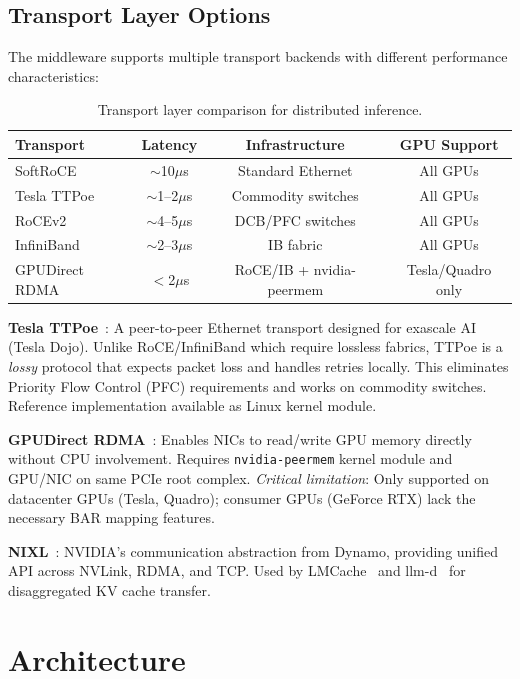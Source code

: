 \documentclass[10pt,letterpaper]{article}
\begin{document}
\subsection{Transport Layer Options}

The middleware supports multiple transport backends with different performance characteristics:

\begin{table}[h]
\centering
\small
\begin{tabular}{@{}lccc@{}}
\toprule
\textbf{Transport} & \textbf{Latency} & \textbf{Infrastructure} & \textbf{GPU Support} \\
\midrule
SoftRoCE & $\sim$10$\mu$s & Standard Ethernet & All GPUs \\
Tesla TTPoe & $\sim$1--2$\mu$s & Commodity switches & All GPUs \\
RoCEv2 & $\sim$4--5$\mu$s & DCB/PFC switches & All GPUs \\
InfiniBand & $\sim$2--3$\mu$s & IB fabric & All GPUs \\
GPUDirect RDMA & $<$2$\mu$s & RoCE/IB + nvidia-peermem & Tesla/Quadro only \\
\bottomrule
\end{tabular}
\caption{Transport layer comparison for distributed inference.}
\end{table}

\textbf{Tesla TTPoe}~\cite{ttpoe-repo,ttpoe-hotchips}: A peer-to-peer Ethernet transport designed for exascale AI (Tesla Dojo). Unlike RoCE/InfiniBand which require lossless fabrics, TTPoe is a \textit{lossy} protocol that expects packet loss and handles retries locally. This eliminates Priority Flow Control (PFC) requirements and works on commodity switches. Reference implementation available as Linux kernel module.

\textbf{GPUDirect RDMA}~\cite{gpudirect-docs}: Enables NICs to read/write GPU memory directly without CPU involvement. Requires \texttt{nvidia-peermem} kernel module and GPU/NIC on same PCIe root complex. \textit{Critical limitation}: Only supported on datacenter GPUs (Tesla, Quadro); consumer GPUs (GeForce RTX) lack the necessary BAR mapping features.

\textbf{NIXL}~\cite{nixl}: NVIDIA's communication abstraction from Dynamo, providing unified API across NVLink, RDMA, and TCP. Used by LMCache~\cite{lmcache} and llm-d~\cite{llm-d} for disaggregated KV cache transfer.

\section{Architecture}
\end{document}
